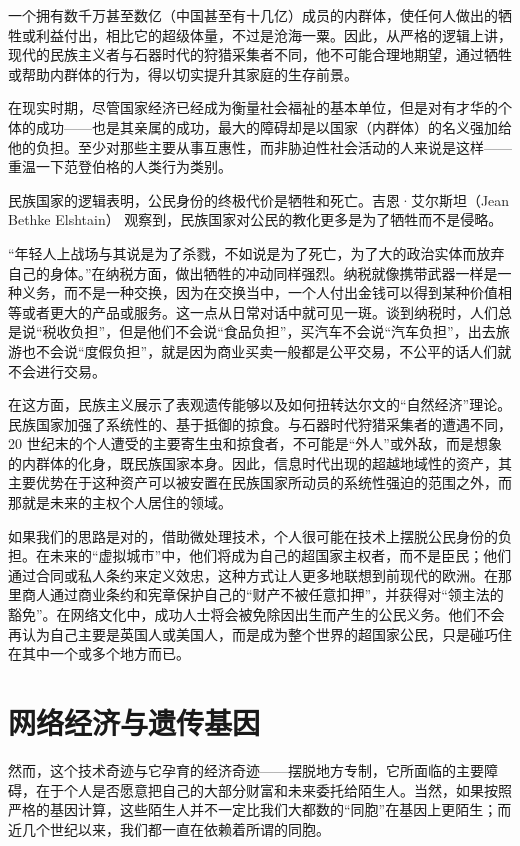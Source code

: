 一个拥有数千万甚至数亿（中国甚至有十几亿）成员的内群体，使任何人做出的牺牲或利益付出，相比它的超级体量，不过是沧海一粟。因此，从严格的逻辑上讲，现代的民族主义者与石器时代的狩猎采集者不同，他不可能合理地期望，通过牺牲或帮助内群体的行为，得以切实提升其家庭的生存前景。

在现实时期，尽管国家经济已经成为衡量社会福祉的基本单位，但是对有才华的个体的成功——也是其亲属的成功，最大的障碍却是以国家（内群体）的名义强加给他的负担。至少对那些主要从事互惠性，而非胁迫性社会活动的人来说是这样——重温一下范登伯格的人类行为类别。

民族国家的逻辑表明，公民身份的终极代价是牺牲和死亡。吉恩·艾尔斯坦（Jean Bethke Elshtain） 观察到，民族国家对公民的教化更多是为了牺牲而不是侵略。

“年轻人上战场与其说是为了杀戮，不如说是为了死亡，为了大的政治实体而放弃自己的身体。”在纳税方面，做出牺牲的冲动同样强烈。纳税就像携带武器一样是一种义务，而不是一种交换，因为在交换当中，一个人付出金钱可以得到某种价值相等或者更大的产品或服务。这一点从日常对话中就可见一斑。谈到纳税时，人们总是说“税收负担”，但是他们不会说“食品负担”，买汽车不会说“汽车负担”，出去旅游也不会说“度假负担”，就是因为商业买卖一般都是公平交易，不公平的话人们就不会进行交易。

在这方面，民族主义展示了表观遗传能够以及如何扭转达尔文的“自然经济”理论。民族国家加强了系统性的、基于抵御的掠食。与石器时代狩猎采集者的遭遇不同，20 世纪末的个人遭受的主要寄生虫和掠食者，不可能是“外人”或外敌，而是想象的内群体的化身，既民族国家本身。因此，信息时代出现的超越地域性的资产，其主要优势在于这种资产可以被安置在民族国家所动员的系统性强迫的范围之外，而那就是未来的主权个人居住的领域。

如果我们的思路是对的，借助微处理技术，个人很可能在技术上摆脱公民身份的负担。在未来的“虚拟城市”中，他们将成为自己的超国家主权者，而不是臣民；他们通过合同或私人条约来定义效忠，这种方式让人更多地联想到前现代的欧洲。在那里商人通过商业条约和宪章保护自己的“财产不被任意扣押”，并获得对“领主法的豁免”。在网络文化中，成功人士将会被免除因出生而产生的公民义务。他们不会再认为自己主要是英国人或美国人，而是成为整个世界的超国家公民，只是碰巧住在其中一个或多个地方而已。

\section{网络经济与遗传基因}
然而，这个技术奇迹与它孕育的经济奇迹——摆脱地方专制，它所面临的主要障碍，在于个人是否愿意把自己的大部分财富和未来委托给陌生人。当然，如果按照严格的基因计算，这些陌生人并不一定比我们大都数的“同胞”在基因上更陌生；而近几个世纪以来，我们都一直在依赖着所谓的同胞。


